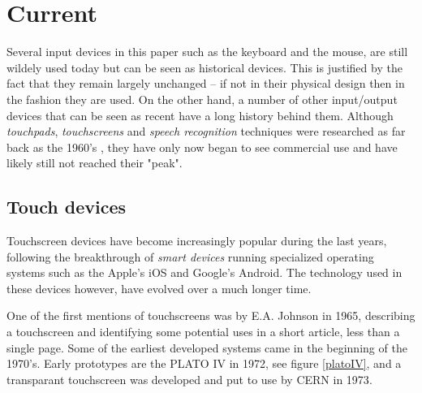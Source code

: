 \section{Current}
\label{current}

Several input devices in this paper such as the keyboard and the mouse, are still wildely used today but can be seen as historical devices. This is justified by the fact that they remain largely unchanged -- if not in their physical design then in the fashion they are used. On the other hand, a number of other input/output devices that can be seen as recent have a long history behind them. Although \emph{touchpads}, \emph{touchscreens} and \emph{speech recognition} techniques were researched as far back as the 1960's \cite{buxton}\cite{shoebox}, they have only now began to see commercial use and have likely still not reached their "peak". 


\subsection{Touch devices}
Touchscreen devices have become increasingly popular during the last years, following the breakthrough of \emph{smart devices} running specialized operating systems such as the Apple's iOS and Google's Android. The technology used in these devices however, have evolved over a much longer time.

One of the first mentions of touchscreens was by E.A. Johnson in 1965, describing a touchscreen and identifying some potential uses in a short article, less than a single page\cite{4205802}. Some of the earliest developed systems came in the beginning of the 1970's. Early prototypes are the PLATO IV\cite{buxton} in 1972, see figure \ref{platoIV}, and a transparant touchscreen was developed and put to use by CERN in 1973\cite{cern}.

